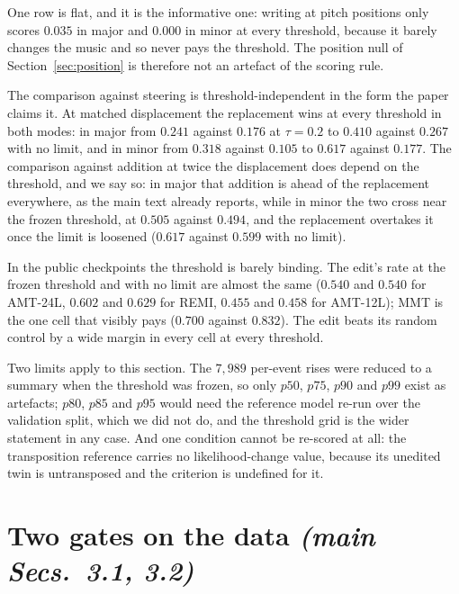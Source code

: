 \documentclass{article}
\begin{document}
One row is flat, and it is the informative one: writing at pitch positions only scores
$0.035$ in major and $0.000$ in minor at every threshold, because it barely changes the
music and so never pays the threshold. The position null of Section~\ref{sec:position} is
therefore not an artefact of the scoring rule.

The comparison against steering is threshold-independent in the form the paper claims
it. At matched displacement the replacement wins at every threshold in both modes: in
major from $0.241$ against $0.176$ at $\tau=0.2$ to $0.410$ against $0.267$ with no
limit, and in minor from $0.318$ against $0.105$ to $0.617$ against $0.177$. The
comparison against addition at twice the displacement does depend on the threshold, and
we say so: in major that addition is ahead of the replacement everywhere, as the main
text already reports, while in minor the two cross near the frozen threshold, at $0.505$
against $0.494$, and the replacement overtakes it once the limit is loosened ($0.617$
against $0.599$ with no limit).

In the public checkpoints the threshold is barely binding. The edit's rate at the frozen
threshold and with no limit are almost the same ($0.540$ and $0.540$ for AMT-24L,
$0.602$ and $0.629$ for REMI, $0.455$ and $0.458$ for AMT-12L); MMT is the one cell
that visibly pays ($0.700$ against $0.832$). The edit beats its random control by a
wide margin in every cell at every threshold.

Two limits apply to this section. The $7{,}989$ per-event rises were reduced to a
summary when the threshold was frozen, so only $p50$, $p75$, $p90$ and $p99$ exist as
artefacts; $p80$, $p85$ and $p95$ would need the reference model re-run over the
validation split, which we did not do, and the threshold grid is the wider statement in
any case. And one condition cannot be re-scored at all: the transposition reference
carries no likelihood-change value, because its unedited twin is untransposed and the
criterion is undefined for it.

\section{Two gates on the data \normalfont\textit{(main Secs.~3.1, 3.2)}}
\end{document}
